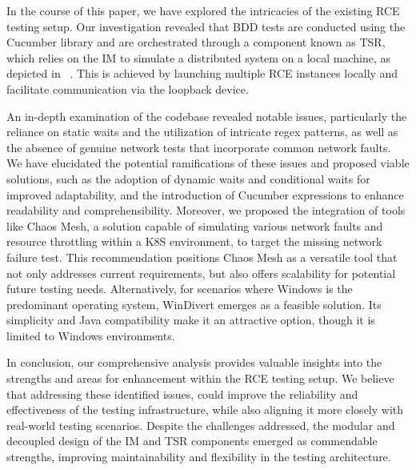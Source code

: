 \label{sec:conclusion}
In the course of this paper, we have explored the intricacies of the existing RCE testing setup. Our investigation revealed that \acf{BDD} tests are conducted using the Cucumber library and are orchestrated through a component known as \acf{TSR}, which relies on the \acf{IM} to simulate a distributed system on a local machine, as depicted in ~. This is achieved by launching multiple RCE instances locally and facilitate communication via the loopback device. 

An in-depth examination of the codebase revealed notable issues, particularly the reliance on static waits and the utilization of intricate regex patterns, as well as the absence of genuine network tests that incorporate common network faults. We have elucidated the potential ramifications of these issues and proposed viable solutions, such as the adoption of dynamic waits and conditional waits for improved adaptability, and the introduction of Cucumber expressions to enhance readability and comprehensibility. Moreover, we proposed the integration of tools like Chaos Mesh, a solution capable of simulating various network faults and resource throttling within a \acf{K8S} environment, to target the missing network failure test. This recommendation positions Chaos Mesh as a versatile tool that not only addresses current requirements, but also offers scalability for potential future testing needs. Alternatively, for scenarios where Windows is the predominant operating system, WinDivert emerges as a feasible solution. Its simplicity and Java compatibility make it an attractive option, though it is limited to Windows environments. 

In conclusion, our comprehensive analysis provides valuable insights into the strengths and areas for enhancement within the RCE testing setup. We believe that addressing these identified issues, could improve the reliability and effectiveness of the testing infrastructure, while also aligning it more closely with real-world testing scenarios. Despite the challenges addressed, the modular and decoupled design of the \ac{IM} and \ac{TSR} components emerged as commendable strengths, improving maintainability and flexibility in the testing architecture.
